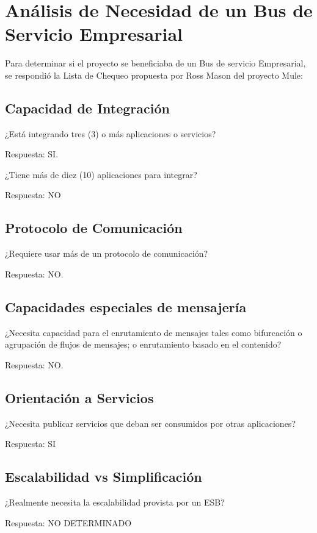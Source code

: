 \chapter{Análisis de Necesidad de un Bus de Servicio Empresarial}
\label{appendix:lista_de_chequeo_ESB}

Para determinar si el proyecto se beneficiaba de un Bus de servicio Empresarial, se respondió la Lista de Chequeo propuesta por Ross Mason del proyecto Mule:

\section{Capacidad de Integración}

¿Está integrando tres (3) o más aplicaciones o servicios?

Respuesta: SI.

¿Tiene más de diez (10) aplicaciones para integrar?

Respuesta: NO

\section{Protocolo de Comunicación}
¿Requiere usar más de un protocolo de comunicación?

Respuesta: NO.

\section{Capacidades especiales de mensajería}
¿Necesita capacidad para el enrutamiento de mensajes tales como bifurcación o agrupación de flujos de mensajes; o enrutamiento basado en el contenido?

Respuesta: NO.

\section{Orientación a Servicios}

¿Necesita publicar servicios que deban ser consumidos por otras aplicaciones?

Respuesta: SI

\section{Escalabilidad vs Simplificación}
¿Realmente necesita la escalabilidad provista por un ESB?

Respuesta: NO DETERMINADO

